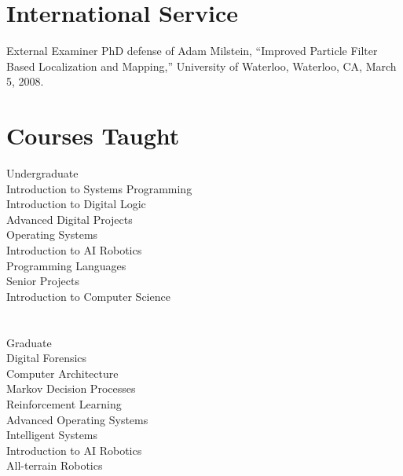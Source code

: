 \documentclass[10pt]{resume}
\begin{document}
\section{International Service}{External Examiner}
{
PhD defense of Adam Milstein, ``Improved Particle Filter Based Localization and Mapping,''
University of Waterloo, Waterloo, CA, March 5, 2008.
}





\section{Courses Taught}{Undergraduate}
{\\
\hspace*{1em} Introduction to Systems Programming\\
\hspace*{1em} Introduction to Digital Logic\\
\hspace*{1em} Advanced Digital Projects\\
\hspace*{1em} Operating Systems\\
\hspace*{1em} Introduction to AI Robotics\\
\hspace*{1em} Programming Languages\\
\hspace*{1em} Senior Projects\\
\hspace*{1em} Introduction to Computer Science
}

\section{}{Graduate}
{\\
\hspace*{1em} Digital Forensics\\
\hspace*{1em} Computer Architecture\\
\hspace*{1em} Markov Decision Processes\\
\hspace*{1em} Reinforcement Learning\\
\hspace*{1em} Advanced Operating Systems\\
\hspace*{1em} Intelligent Systems\\
\hspace*{1em} Introduction to AI Robotics\\
\hspace*{1em} All-terrain Robotics
}
\end{document}
